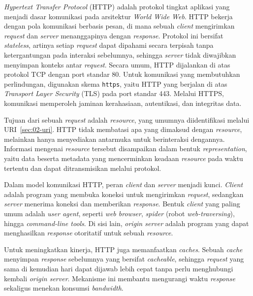 \textit{Hypertext Transfer Protocol} (HTTP) adalah protokol tingkat aplikasi yang menjadi dasar komunikasi pada arsitektur \textit{World Wide Web}. HTTP bekerja dengan pola komunikasi berbasis pesan, di mana sebuah \textit{client} mengirimkan \textit{request} dan \textit{server} menanggapinya dengan \textit{response}. Protokol ini bersifat \textit{stateless}, artinya setiap \textit{request} dapat dipahami secara terpisah tanpa ketergantungan pada interaksi sebelumnya, sehingga \textit{server} tidak diwajibkan menyimpan konteks antar \textit{request}. Secara umum, HTTP dijalankan di atas protokol TCP dengan port standar 80. Untuk komunikasi yang membutuhkan perlindungan, digunakan skema \texttt{https}, yaitu HTTP yang berjalan di atas \textit{Transport Layer Security} (TLS) pada port standar 443. Melalui HTTPS, komunikasi memperoleh jaminan kerahasiaan, autentikasi, dan integritas data.

Tujuan dari sebuah \textit{request} adalah \textit{resource}, yang umumnya diidentifikasi melalui URI~\ref{sec:02-uri}. HTTP tidak membatasi apa yang dimaksud dengan \textit{resource}, melainkan hanya menyediakan antarmuka untuk berinteraksi dengannya. Informasi mengenai \textit{resource} tersebut disampaikan dalam bentuk \textit{representation}, yaitu data beserta metadata yang mencerminkan keadaan \textit{resource} pada waktu tertentu dan dapat ditransmisikan melalui protokol.

Dalam model komunikasi HTTP, peran \textit{client} dan \textit{server} menjadi kunci. \textit{Client} adalah program yang membuka koneksi untuk mengirimkan \textit{request}, sedangkan \textit{server} menerima koneksi dan memberikan \textit{response}. Bentuk \textit{client} yang paling umum adalah \textit{user agent}, seperti \textit{web browser}, \textit{spider} (robot \textit{web-traversing}), hingga \textit{command-line tools}. Di sisi lain, \textit{origin server} adalah program yang dapat menghasilkan \textit{response} otoritatif untuk sebuah \textit{resource}.

Untuk meningkatkan kinerja, HTTP juga memanfaatkan \textit{caches}. Sebuah \textit{cache} menyimpan \textit{response} sebelumnya yang bersifat \textit{cacheable}, sehingga \textit{request} yang sama di kemudian hari dapat dijawab lebih cepat tanpa perlu menghubungi kembali \textit{origin server}. Mekanisme ini membantu mengurangi waktu \textit{response} sekaligus menekan konsumsi \textit{bandwidth}. 






